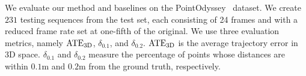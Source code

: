 We evaluate our method and baselines on the PointOdyssey~\cite{zheng2023pointodyssey} dataset. We create $231$ testing sequences from the test set, each consisting of 24 frames and with a reduced frame rate set at one-fifth of the original. We use three evaluation metrics, namely $\rm{ATE}_{3D}$, $\delta_{0.1}$, and $\delta_{0.2}$. $\rm{ATE}_{3D}$ is the average trajectory error in 3D space.
$\delta_{0.1}$ and $\delta_{0.2}$ measure the percentage of points whose distances are within $0.1$m and $0.2$m from the ground truth, respectively.





